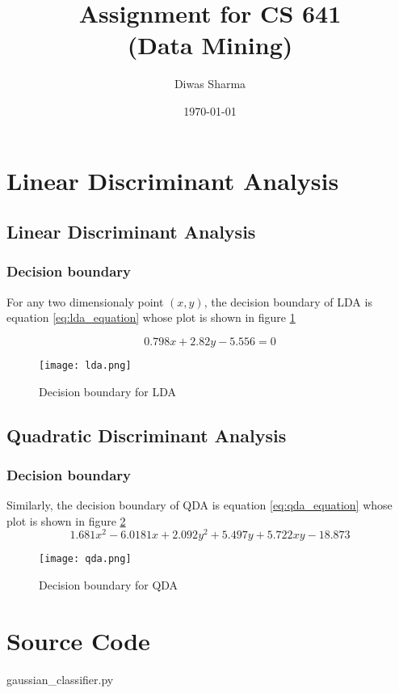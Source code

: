 \documentclass{article}
\title{Assignment for CS 641 \\ (Data Mining)}
\author{Diwas Sharma}
\date{\today}
\begin{document}
\maketitle
\newpage

\section{Linear Discriminant Analysis}

\subsection{Linear Discriminant Analysis}
\subsubsection{Decision boundary}
For any two dimensionaly point $(x, y)$, the decision boundary of LDA is
equation \ref{eq:lda_equation} whose plot is shown in figure \ref{fig:lda_decision_boundary}

\begin{equation}
    \label{eq:lda_equation}
    0.798 x + 2.82 y - 5.556 = 0
\end{equation}

\begin{figure}[!ht]
  \texttt{[image: lda.png]}
  \caption{Decision boundary for LDA}
  \label{fig:lda_decision_boundary}
\end{figure}

\subsection{Quadratic Discriminant Analysis}
\subsubsection{Decision boundary}
Similarly, the decision boundary of QDA is equation \ref{eq:qda_equation}
whose plot is shown in figure \ref{fig:qda_decision_boundary}
\begin{equation}
    \label{eq:qda_equation}
    1.681 x^{2} - 6.0181 x + 2.092 y^{2} + 5.497y + 5.722xy - 18.873
\end{equation}

\begin{figure}[!ht]
  \texttt{[image: qda.png]}
  \caption{Decision boundary for QDA}
  \label{fig:qda_decision_boundary}
\end{figure}

\section{Source Code}
\begin{lstinputlisting}[language=python]{gaussian_classifier.py}
\end{lstinputlisting}
\end{document}
